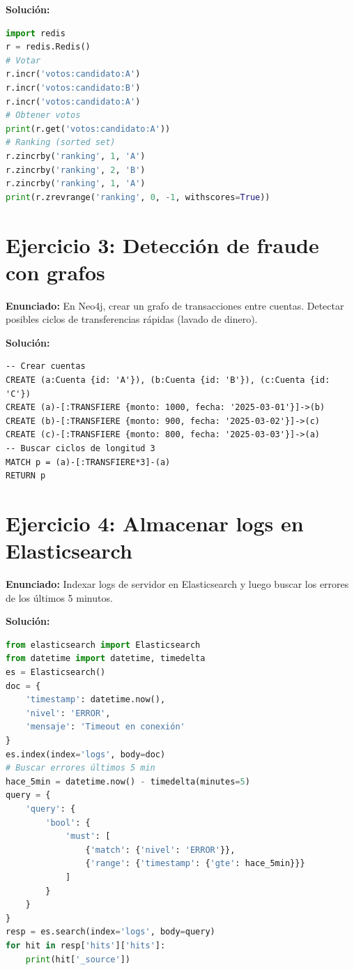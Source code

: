 \documentclass[12pt,a4paper,openany,oneside]{book}
\begin{document}
\textbf{Solución:}
\begin{lstlisting}[language=Python]
import redis
r = redis.Redis()
# Votar
r.incr('votos:candidato:A')
r.incr('votos:candidato:B')
r.incr('votos:candidato:A')
# Obtener votos
print(r.get('votos:candidato:A'))
# Ranking (sorted set)
r.zincrby('ranking', 1, 'A')
r.zincrby('ranking', 2, 'B')
r.zincrby('ranking', 1, 'A')
print(r.zrevrange('ranking', 0, -1, withscores=True))
\end{lstlisting}

\section{Ejercicio 3: Detección de fraude con grafos}
\textbf{Enunciado:} En Neo4j, crear un grafo de transacciones entre cuentas. Detectar posibles ciclos de transferencias rápidas (lavado de dinero).

\textbf{Solución:}
\begin{lstlisting}[language=Cypher]
-- Crear cuentas
CREATE (a:Cuenta {id: 'A'}), (b:Cuenta {id: 'B'}), (c:Cuenta {id: 'C'})
CREATE (a)-[:TRANSFIERE {monto: 1000, fecha: '2025-03-01'}]->(b)
CREATE (b)-[:TRANSFIERE {monto: 900, fecha: '2025-03-02'}]->(c)
CREATE (c)-[:TRANSFIERE {monto: 800, fecha: '2025-03-03'}]->(a)
-- Buscar ciclos de longitud 3
MATCH p = (a)-[:TRANSFIERE*3]-(a)
RETURN p
\end{lstlisting}

\section{Ejercicio 4: Almacenar logs en Elasticsearch}
\textbf{Enunciado:} Indexar logs de servidor en Elasticsearch y luego buscar los errores de los últimos 5 minutos.

\textbf{Solución:}
\begin{lstlisting}[language=Python]
from elasticsearch import Elasticsearch
from datetime import datetime, timedelta
es = Elasticsearch()
doc = {
    'timestamp': datetime.now(),
    'nivel': 'ERROR',
    'mensaje': 'Timeout en conexión'
}
es.index(index='logs', body=doc)
# Buscar errores últimos 5 min
hace_5min = datetime.now() - timedelta(minutes=5)
query = {
    'query': {
        'bool': {
            'must': [
                {'match': {'nivel': 'ERROR'}},
                {'range': {'timestamp': {'gte': hace_5min}}}
            ]
        }
    }
}
resp = es.search(index='logs', body=query)
for hit in resp['hits']['hits']:
    print(hit['_source'])
\end{lstlisting}
\end{document}
